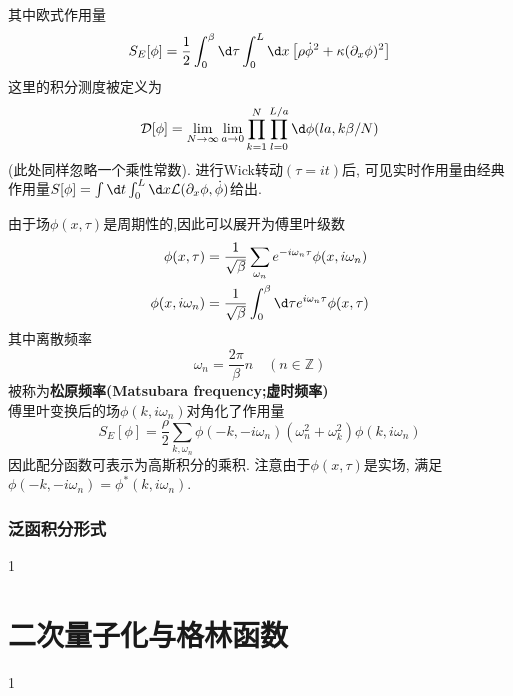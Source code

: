 其中欧式作用量
\begin{equation}
    S_E[\phi]=\frac{1}{2}\int_0^\beta \d\tau\int_0^L\dx\left[\rho\dot{\phi}^2+\kappa(\partial_x\phi)^2\right]
\end{equation}
这里的积分测度被定义为
\begin{equation}
    \mathcal{D}[\phi]=\lim_{N\to\infty}\lim_{a\to0}\prod_{k=1}^N\prod_{l=0}^{L/a}\d\phi(la,k\beta/N)
\end{equation}
(此处同样忽略一个乘性常数). 进行Wick转动$(\tau=it)$后, 可见实时作用量由经典作用量$S[\phi]=\int \d t\int_0^L \dx\mathcal{L}(\partial_x\phi,\dot{\phi})$给出.  

由于场$\phi(x,\tau)$是周期性的,因此可以展开为傅里叶级数
\begin{equation}
    \begin{aligned}
        \phi(x,\tau)&=\frac{1}{\sqrt{\beta}}\sum_{\omega_n}e^{-i\omega_n\tau}\phi(x,i\omega_n)\\
        \phi(x,i\omega_n)&=\frac{1}{\sqrt{\beta}}\int_0^\beta \d\tau e^{i\omega_n\tau}\phi(x,\tau)
    \end{aligned}
\end{equation}
其中离散频率
\begin{equation}
    \omega_n=\frac{2\pi}{\beta}n\quad(n\in\mathbb{Z})
\end{equation}
被称为\textbf{松原频率(Matsubara frequency;虚时频率)}\\
傅里叶变换后的场$\phi(k,i\omega_n)$对角化了作用量
\begin{equation}
    S_E[\phi]=\frac{\rho}{2}\sum_{k,\omega_n}\phi(-k,-i\omega_n)\left(\omega_n^2+\omega_k^2\right)\phi(k,i\omega_n)
\end{equation}
因此配分函数可表示为高斯积分的乘积. 注意由于$\phi(x,\tau)$是实场, 满足$\phi(-k,-i\omega_n)=\phi^*(k,i\omega_n)$.  








\subsubsection{泛函积分形式}
1
\section{二次量子化与格林函数}
1


